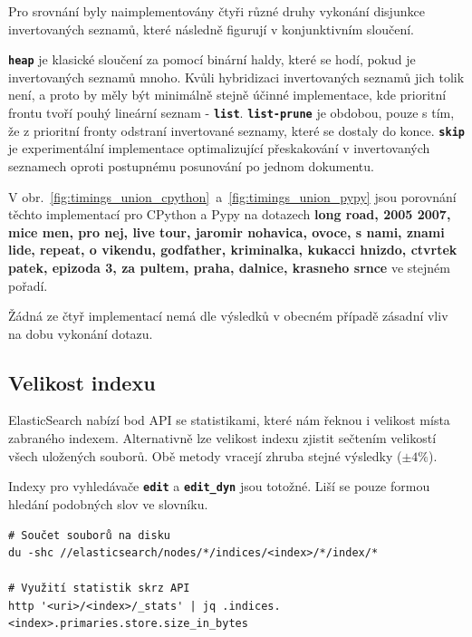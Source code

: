 \documentclass[11pt,letterpaper,oneside,openright]{book}
\newcommand{\bftt}[1]{\texttt{\textbf{#1}}}
\begin{document}
Pro srovnání byly naimplementovány čtyři různé druhy vykonání disjunkce
invertovaných seznamů, které následně figurují v konjunktivním sloučení.

\bftt{heap} je klasické sloučení za pomocí binární haldy, které se hodí, pokud
je invertovaných seznamů mnoho. Kvůli hybridizaci invertovaných seznamů jich
tolik není, a proto by měly být minimálně stejně účinné implementace, kde
prioritní frontu tvoří pouhý lineární seznam - \bftt{list}. \bftt{list-prune}
je obdobou, pouze s tím, že z prioritní fronty odstraní invertované seznamy,
které se dostaly do konce. \bftt{skip} je experimentální implementace
optimalizující přeskakování v invertovaných seznamech oproti postupnému
posunování po jednom dokumentu.

V obr.~\ref{fig:timings_union_cpython}~a~\ref{fig:timings_union_pypy} jsou
porovnání těchto implementací pro CPython a Pypy na dotazech \textbf{long road,
2005 2007, mice men, pro nej, live tour, jaromir nohavica, ovoce, s nami, znami
lide, repeat, o vikendu, godfather, kriminalka, kukacci hnizdo, ctvrtek patek,
epizoda 3, za pultem, praha, dalnice, krasneho srnce} ve stejném pořadí.

Žádná ze čtyř implementací nemá dle výsledků v obecném případě zásadní vliv na
dobu vykonání dotazu.

\subsection{Velikost indexu}
ElasticSearch nabízí bod API se statistikami, které nám řeknou i velikost místa
zabraného indexem. Alternativně lze velikost indexu zjistit sečtením velikostí
všech uložených souborů. Obě metody vracejí zhruba stejné výsledky ($\pm 4\%$).

Indexy pro vyhledávače \bftt{edit} a \bftt{edit\_dyn} jsou totožné. Liší se
pouze formou hledání podobných slov ve slovníku.

\begin{Verbatim}
# Součet souborů na disku
du -shc //elasticsearch/nodes/*/indices/<index>/*/index/*

# Využití statistik skrz API
http '<uri>/<index>/_stats' | jq .indices.<index>.primaries.store.size_in_bytes
\end{Verbatim}
\end{document}
